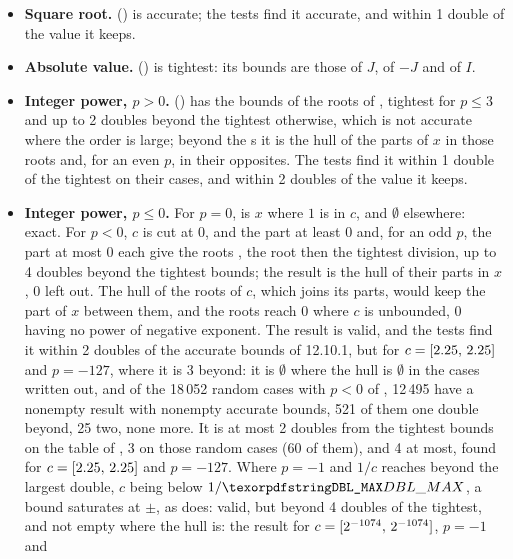 \begin{itemize}
\item[$\bullet$] \textbf{Square root.} 
  () is accurate; the tests find it accurate, and within 1
  double of the value it keeps.
\item[$\bullet$] \textbf{Absolute value.} 
  () is tightest: its bounds are those of $J$, of $-J$ and of
  $I$.
\item[$\bullet$] \textbf{Integer power, $p>0$.}
   () has the bounds of the roots of
  , tightest for $p\leq3$ and up to 2 doubles beyond the
  tightest otherwise, which is not accurate where the order is large; beyond the s it
  is the hull of the parts of $x$ in those roots and, for an even $p$, in
  their opposites.\newinvfive{} The tests find it within 1 double of
  the tightest on their cases, and within 2 doubles of the value it keeps.
\item[$\bullet$] \textbf{Integer power, $p\leq0$.}\newinvfive{} For $p=0$,
   is $x$ where $1$ is in $c$, and
  $\emptyset$ elsewhere: exact. For $p<0$, $c$ is cut at $0$, and the part
  at least $0$ and, for an odd $p$, the part at most $0$ each give the
  roots , the root then the tightest division, up
  to 4 doubles beyond the tightest bounds; the result is the hull of their
  parts in $x$, $0$ left out. The hull of the roots of $c$, which joins its
  parts, would keep the part of $x$ between them, and the roots reach $0$
  where $c$ is unbounded, $0$ having no power of negative exponent. The
  result is valid, and the tests find it within 2 doubles of the accurate
  bounds of 12.10.1, but for $c=[2.25,\,2.25]$ and $p=-127$, where it is 3
  beyond: it is $\emptyset$ where
  the hull is $\emptyset$ in the cases written out, and of the 18\,052 random
  cases with $p<0$ of
  , 12\,495 have a nonempty result with
  nonempty accurate bounds, 521 of them one double beyond, 25 two, none
  more. It is at most 2 doubles from the tightest bounds on the table of
  , 3 on those random cases (60 of them), and 4 at
  most, found for $c=[2.25,\,2.25]$ and $p=-127$. Where $p=-1$ and
  $1/c$ reaches beyond the largest double, $c$ being below $1/\code{DBL\_MAX}$, a
  bound saturates at $\pm$, as  does: valid,
  but beyond 4 doubles of the tightest, and not empty where the hull is:
  the result for $c=[2^{-1074},\,2^{-1074}]$, $p=-1$ and

\end{itemize}
